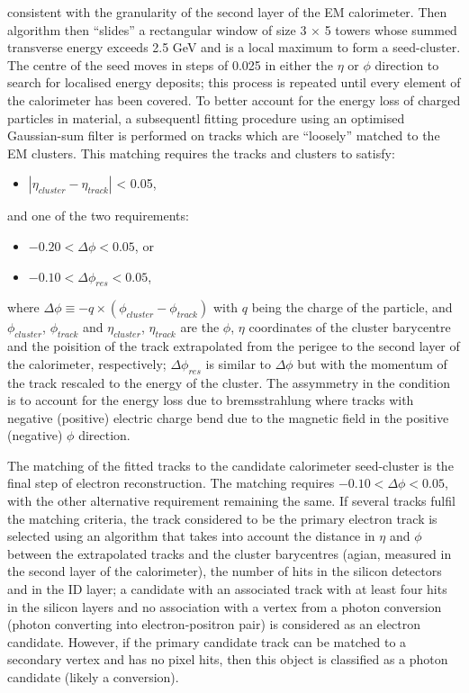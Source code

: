 consistent with the granularity of the second layer of the EM calorimeter. 
Then algorithm then ``slides'' a rectangular window of size 3 $\times$ 5 towers 
whose summed transverse energy exceeds 2.5 GeV and is a local maximum
to form a seed-cluster.
The centre of the seed moves in steps of 0.025 in 
either the $\eta$ or $\phi$ direction 
to search for localised energy deposits; 
this process is repeated until every element of the calorimeter has been covered.
To better account for the energy loss of charged particles in material,
a subsequentl fitting procedure using 
an optimised Gaussian-sum filter \cite{ATLAS-CONF-2012-047} 
is performed on tracks which are ``loosely'' matched to the EM clusters.
This matching requires the tracks and clusters to satisfy:
\begin{itemize}
    \item $|\eta_{cluster} - \eta_{track}|$ < 0.05,
\end{itemize}
and one of the two requirements:
\begin{itemize}
    \item $-0.20 < \Delta \phi < 0.05$, or
    \item $-0.10 < \Delta \phi_{res} < 0.05$,
\end{itemize}

where $\Delta\phi \equiv -q \times (\phi_{cluster} - \phi_{track})$ with 
$q$ being the charge of the particle, and 
$\phi_{cluster}$, $\phi_{track}$ and $\eta_{cluster}$, $\eta_{track}$ 
are the $\phi$, $\eta$ coordinates of
the cluster barycentre and the poisition of the track extrapolated from the 
perigee to the second layer of the calorimeter, respectively;
$\Delta \phi_{res}$ is similar to $\Delta \phi$ but with the 
momentum of the track rescaled to the energy of the cluster.
The assymmetry in the condition is to account for the energy loss
due to bremsstrahlung where tracks with negative (positive) electric charge
bend due to the magnetic field in the positive (negative) $\phi$ direction.

The matching of the fitted tracks to the candidate calorimeter seed-cluster
is the final step of electron reconstruction. 
The matching requires $-0.10 < \Delta\phi < 0.05$,
with the other alternative requirement remaining the same.
If several tracks fulfil the matching criteria, 
the track considered to be the primary electron track is selected 
using an algorithm that takes into account the distance in $\eta$
and $\phi$ between the extrapolated tracks and the cluster barycentres 
(agian, measured in the second layer of the calorimeter), 
the number of hits in the silicon detectors and in the ID layer; 
a candidate with an associated track with at least four hits in the silicon layers and no association
with a vertex from a photon conversion (photon converting into electron-positron pair) 
is considered as an electron candidate. 
However, if the primary candidate track can be matched to a secondary vertex and has no pixel hits, 
then this object is classified as a photon candidate (likely a conversion). 

